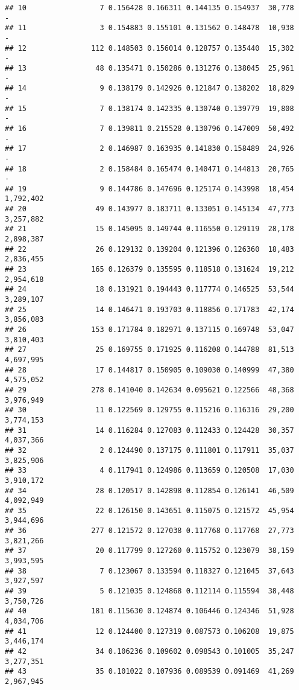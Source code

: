 \documentclass[]{article}
\begin{document}
\begin{verbatim}
## 10                 7 0.156428 0.166311 0.144135 0.154937  30,778         -
## 11                 3 0.154883 0.155101 0.131562 0.148478  10,938         -
## 12               112 0.148503 0.156014 0.128757 0.135440  15,302         -
## 13                48 0.135471 0.150286 0.131276 0.138045  25,961         -
## 14                 9 0.138179 0.142926 0.121847 0.138202  18,829         -
## 15                 7 0.138174 0.142335 0.130740 0.139779  19,808         -
## 16                 7 0.139811 0.215528 0.130796 0.147009  50,492         -
## 17                 2 0.146987 0.163935 0.141830 0.158489  24,926         -
## 18                 2 0.158484 0.165474 0.140471 0.144813  20,765         -
## 19                 9 0.144786 0.147696 0.125174 0.143998  18,454 1,792,402
## 20                49 0.143977 0.183711 0.133051 0.145134  47,773 3,257,882
## 21                15 0.145095 0.149744 0.116550 0.129119  28,178 2,898,387
## 22                26 0.129132 0.139204 0.121396 0.126360  18,483 2,836,455
## 23               165 0.126379 0.135595 0.118518 0.131624  19,212 2,954,618
## 24                18 0.131921 0.194443 0.117774 0.146525  53,544 3,289,107
## 25                14 0.146471 0.193703 0.118856 0.171783  42,174 3,856,083
## 26               153 0.171784 0.182971 0.137115 0.169748  53,047 3,810,403
## 27                25 0.169755 0.171925 0.116208 0.144788  81,513 4,697,995
## 28                17 0.144817 0.150905 0.109030 0.140999  47,380 4,575,052
## 29               278 0.141040 0.142634 0.095621 0.122566  48,368 3,976,949
## 30                11 0.122569 0.129755 0.115216 0.116316  29,200 3,774,153
## 31                14 0.116284 0.127083 0.112433 0.124428  30,357 4,037,366
## 32                 2 0.124490 0.137175 0.111801 0.117911  35,037 3,825,906
## 33                 4 0.117941 0.124986 0.113659 0.120508  17,030 3,910,172
## 34                28 0.120517 0.142898 0.112854 0.126141  46,509 4,092,949
## 35                22 0.126150 0.143651 0.115075 0.121572  45,954 3,944,696
## 36               277 0.121572 0.127038 0.117768 0.117768  27,773 3,821,266
## 37                20 0.117799 0.127260 0.115752 0.123079  38,159 3,993,595
## 38                 7 0.123067 0.133594 0.118327 0.121045  37,643 3,927,597
## 39                 5 0.121035 0.124868 0.112114 0.115594  38,448 3,750,726
## 40               181 0.115630 0.124874 0.106446 0.124346  51,928 4,034,706
## 41                12 0.124400 0.127319 0.087573 0.106208  19,875 3,446,174
## 42                34 0.106236 0.109602 0.098543 0.101005  35,247 3,277,351
## 43                35 0.101022 0.107936 0.089539 0.091469  41,269 2,967,945

\end{verbatim}
\end{document}
